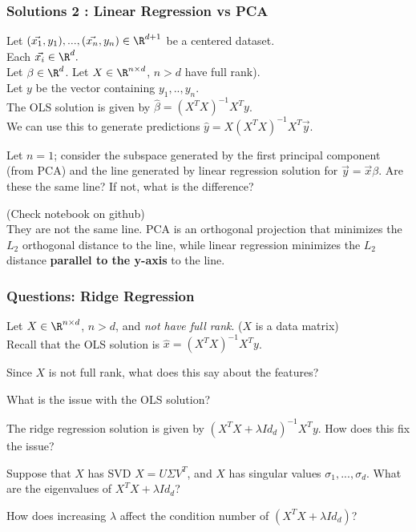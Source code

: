 \documentclass{beamer}
\renewenvironment{enumerate}%
{\begin{list}{\arabic{enumi}.}%
      {\setlength{\leftmargin}{2.5em}%
       \setlength{\itemsep}{-\parsep}%
       \setlength{\topsep}{-\parskip}%
       \usecounter{enumi}}%
 }{\end{list}}
\begin{document}
\begin{frame}
\frametitle{Solutions 2 : Linear Regression vs PCA}
Let $(\vec{x_1},y_1),...,(\vec{x_n},y_n) \in \R^{d+1}$ be a centered dataset.\\
 Each $\vec{x_i}\in\R^d.$\\
Let $\beta \in \R^d$. Let $X\in\R^{n\times d}$, $n>d$ have full rank).\\
Let $y$ be the vector containing $y_1,..,y_n$.\\
The OLS solution is given by $\hat{\beta} = (X^TX)^{-1}X^Ty$.  \\
We can use this to generate predictions $\hat{y} = X(X^TX)^{-1}X^T\vec{y}$.\\

\begin{enumerate}
\item[2.] Let $n = 1$; consider the subspace generated by the first principal component (from PCA) and the line generated by linear regression solution for $\vec{y}=\vec{x}\beta$.
Are these the same line? If not, what is the difference?
\begin{solution}
(Check notebook on github)\\
They are not the same line. PCA is an orthogonal projection that minimizes the $L_2$ orthogonal distance to the line,
 while linear regression minimizes the $L_2$ distance \textbf{parallel to the y-axis} to the line.
\end{solution}
\end{enumerate}
\end{frame}


\begin{frame}
\frametitle{Questions: Ridge Regression}
Let $X \in \R^{n\times d}$, $n>d$, and \textit{not have full rank}. ($X$ is a data matrix) \\
Recall that the OLS solution is $\hat{x} = (X^TX)^{-1}X^Ty$.
\begin{enumerate}
\item Since $X$ is not full rank, what does this say about the features?
\item What is the issue with the OLS solution?
\item The ridge regression solution is given by $(X^TX+\lambda Id_d)^{-1}X^Ty$. How does this fix the issue?
\item Suppose that $X$ has SVD $X=U\Sigma V^T$, and $X$ has singular values $\sigma_1,...,\sigma_d$. What are the eigenvalues of 
$X^TX + \lambda Id_d$?
\item How does increasing $\lambda$ affect the condition number of $(X^TX + \lambda Id_d)$?
\end{enumerate}
\end{frame}
\end{document}
